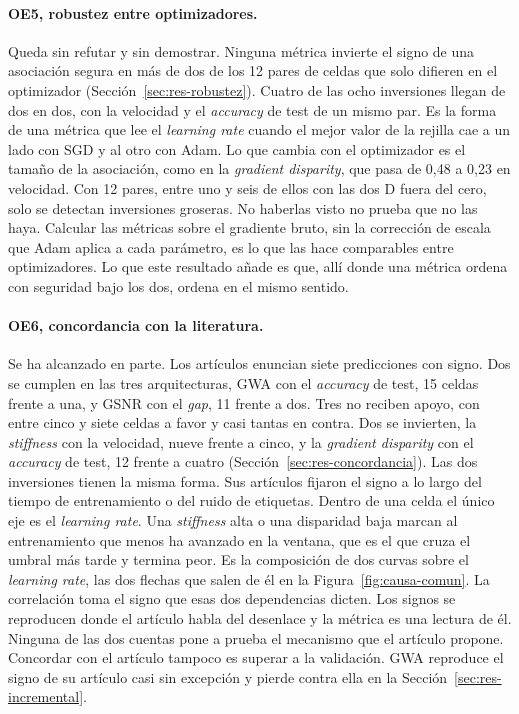 \paragraph{OE5, robustez entre optimizadores.} Queda sin refutar y sin demostrar. Ninguna métrica invierte el signo de una asociación segura en más de dos de los 12 pares de celdas que solo difieren en el optimizador (Sección~\ref{sec:res-robustez}). Cuatro de las ocho inversiones llegan de dos en dos, con la velocidad y el \emph{accuracy} de test de un mismo par. Es la forma de una métrica que lee el \emph{learning rate} cuando el mejor valor de la rejilla cae a un lado con SGD y al otro con Adam. Lo que cambia con el optimizador es el tamaño de la asociación, como en la \emph{gradient disparity}, que pasa de 0,48 a 0,23 en velocidad. Con 12 pares, entre uno y seis de ellos con las dos D fuera del cero, solo se detectan inversiones groseras. No haberlas visto no prueba que no las haya. Calcular las métricas sobre el gradiente bruto, sin la corrección de escala que Adam aplica a cada parámetro, es lo que las hace comparables entre optimizadores. Lo que este resultado añade es que, allí donde una métrica ordena con seguridad bajo los dos, ordena en el mismo sentido.

\paragraph{OE6, concordancia con la literatura.} Se ha alcanzado en parte. Los artículos enuncian siete predicciones con signo. Dos se cumplen en las tres arquitecturas, GWA con el \emph{accuracy} de test, 15 celdas frente a una, y GSNR con el \emph{gap}, 11 frente a dos. Tres no reciben apoyo, con entre cinco y siete celdas a favor y casi tantas en contra. Dos se invierten, la \emph{stiffness} con la velocidad, nueve frente a cinco, y la \emph{gradient disparity} con el \emph{accuracy} de test, 12 frente a cuatro (Sección~\ref{sec:res-concordancia}). Las dos inversiones tienen la misma forma. Sus artículos fijaron el signo a lo largo del tiempo de entrenamiento o del ruido de etiquetas. Dentro de una celda el único eje es el \emph{learning rate}. Una \emph{stiffness} alta o una disparidad baja marcan al entrenamiento que menos ha avanzado en la ventana, que es el que cruza el umbral más tarde y termina peor. Es la composición de dos curvas sobre el \emph{learning rate}, las dos flechas que salen de él en la Figura~\ref{fig:causa-comun}. La correlación toma el signo que esas dos dependencias dicten. Los signos se reproducen donde el artículo habla del desenlace y la métrica es una lectura de él. Ninguna de las dos cuentas pone a prueba el mecanismo que el artículo propone. Concordar con el artículo tampoco es superar a la validación. GWA reproduce el signo de su artículo casi sin excepción y pierde contra ella en la Sección~\ref{sec:res-incremental}.


